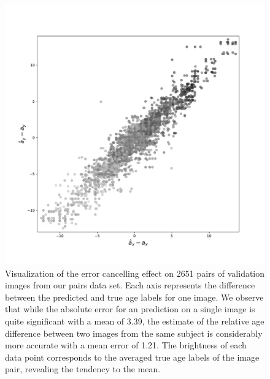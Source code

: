 \begin{figure}
	\centering
	\includegraphics[width=.8\linewidth]{images/age_plots/xr_yr} 
	\vspace*{-15pt}
	\caption{Visualization of the error cancelling effect on 2651 pairs of validation images from our pairs data set. Each axis represents the difference between the predicted and true age labels for one image. We observe that while the absolute error for an prediction on a single image is quite significant with a mean of 3.39, the estimate of the relative age difference between two images from the same subject is considerably more accurate with a mean error of 1.21. The brightness of each data point corresponds to the averaged true age labels of the image pair, revealing the tendency to the mean.}
	\label{fig:regxryr}
\end{figure}

